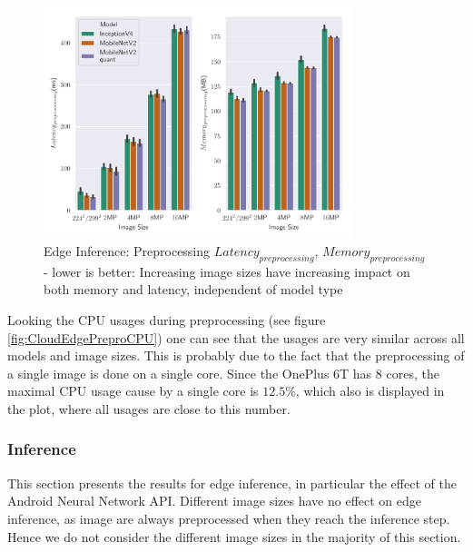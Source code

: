 \begin{figure}[!htb]
\centering
\includegraphics[width=0.8\textwidth]{./Bilder/single_plots/edge_inference_plots/Edge_Inference_Preprocessing.pdf}
\caption[Edge Inference: Preprocessing $Latency_{preprocessing}$, $Memory_{preprocessing}$]{Edge Inference: Preprocessing $Latency_{preprocessing}$, $Memory_{preprocessing}$ -  lower is better: Increasing image sizes have increasing impact on both memory and latency, independent of model type}
\label{fig:EdgePrepro}
\end{figure}
Looking the CPU usages during preprocessing (see figure \ref{fig:CloudEdgePreproCPU}) one can see that the usages are very similar across all models and image sizes. This is probably due to the fact that the preprocessing of a single image is done on a single core. Since the OnePlus 6T has $8$ cores, the maximal CPU usage cause by a single core is $12.5\%$, which also is displayed in the plot, where all usages are close to this number.

\FloatBarrier
\subsubsection{Inference}
This section presents the results for edge inference, in particular the effect of the Android Neural Network API.
Different image sizes have no effect on edge inference, as image are always preprocessed when they reach the inference step.
Hence we do not consider the different image sizes in the majority of this section.


